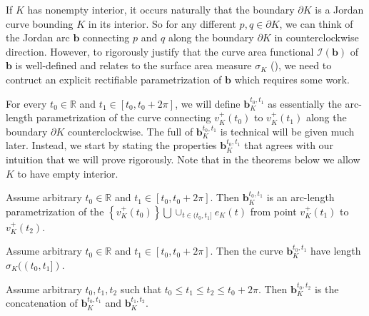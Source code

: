 If \(K\) has nonempty interior, it occurs naturally that the boundary \(\partial K\) is a Jordan curve bounding \(K\) in its interior. So for any different \(p, q \in \partial K\), we can think of the Jordan arc \(\mathbf{b}\) connecting \(p\) and \(q\) along the boundary \(\partial K\) in counterclockwise direction. However, to rigorously justify that the curve area functional \(\mathcal{I}(\mathbf{b})\) of \(\mathbf{b}\) is well-defined and relates to the surface area measure \(\sigma_K\) (), we need to contruct an explicit rectifiable parametrization of \(\mathbf{b}\) which requires some work.

For every \(t_0 \in \mathbb{R}\) and \(t_1 \in [t_0, t_0 + 2\pi]\), we will define \(\mathbf{b}_K^{t_0, t_1}\) as essentially the arc-length parametrization of the curve connecting \(v_K^+(t_0)\) to \(v_K^+(t_1)\) along the boundary \(\partial K\) counterclockwise. The full  of \(\mathbf{b}_{K}^{t_0, t_1}\) is technical will be given much later. Instead, we start by stating the properties \(\mathbf{b}_K^{t_0, t_1}\) that agrees with our intuition that we will prove rigorously. Note that in the theorems below we allow \(K\) to have empty interior.

\begin{theorem}

Assume arbitrary \(t_0 \in \mathbb{R}\) and \(t_1 \in [t_0, t_0 + 2\pi]\). Then \(\mathbf{b}_K^{t_0, t_1}\) is an arc-length parametrization of the \(\left\{ v_K^+(t_0) \right\} \bigcup \cup_{t \in (t_0, t_1]} e_K(t)\) from point \(v_K^+(t_1)\) to \(v_K^+(t_2)\).

\label{thm:param-segment}
\end{theorem}

\begin{theorem}

Assume arbitrary \(t_0 \in \mathbb{R}\) and \(t_1 \in [t_0, t_0 + 2\pi]\). Then the curve \(\mathbf{b}_K^{t_0, t_1}\) have length \(\sigma_K((t_0, t_1])\).

\label{thm:param-segment-length}
\end{theorem}

\begin{theorem}

Assume arbitrary \(t_0, t_1, t_2\) such that \(t_0 \leq t_1 \leq t_2 \leq t_0 + 2\pi\). Then \(\mathbf{b}_{K}^{t_0, t_2}\) is the concatenation of \(\mathbf{b}_{K}^{t_0, t_1}\) and \(\mathbf{b}_{K}^{t_1, t_2}\).

\label{thm:param-concatenation}
\end{theorem}

